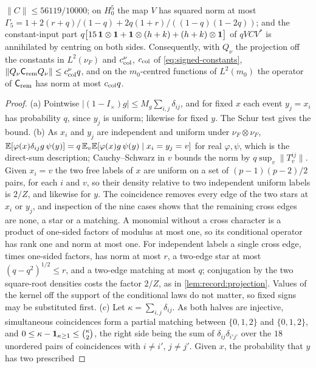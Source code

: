 \begin{lemma}
\begin{enumerate}[label=(\alph*)]
 $\|C\|\le56119/10000$; on $H_0^5$ the map $V$ has squared norm at most
 $\Gamma_5=1+2(r+q)/(1-q)+2q(1+r)/((1-q)(1-2q))$; and the constant-input part
 $q\bigl[15\,\mathbf 1\otimes\mathbf 1+\mathbf 1\otimes(h+k)+(h+k)\otimes\mathbf 1\bigr]$ of $qVCV^*$ is
 annihilated by centring on both sides. Consequently, with $Q_\nu$ the
 projection off the constants in $L^2(\nu_F)$ and $c^\nu_{\rm col}$, $c_{\rm col}$
 of \eqref{eq:signed-constants},
 $\|Q_\nu\mathsf C_{\rm rem}Q_\nu\|\le c^\nu_{\rm col}q$, and on the $m_0$-centred
 functions of $L^2(m_0)$ the operator of $\mathsf C_{\rm rem}$ has norm at most
 $c_{\rm col}q$.
\end{enumerate}
\end{lemma}

\begin{proof}
(a) Pointwise $|(1-I_\times)g|\le M_g\sum_{i,j}\delta_{ij}$, and for fixed $x$ each
event $y_j=x_i$ has probability $q$, since $y_j$ is uniform; likewise for fixed
$y$. The Schur test gives the bound.
(b) As $x_i$ and $y_j$ are independent and uniform under $\nu_F\otimes\nu_F$,
$\mathbb E[\varphi(x)\delta_{ij}g\,\psi(y)]=q\,\mathbb E_v\mathbb E[\varphi(x)g\,\psi(y)\mid x_i=y_j=v]$
for real $\varphi,\psi$, which is the direct-sum description; Cauchy--Schwarz in
$v$ bounds the norm by $q\sup_v\|T^{ij}_v\|$. Given $x_i=v$ the two free labels of
$x$ are uniform on a set of $(p-1)(p-2)/2$ pairs, for each $i$ and $v$, so their
density relative to two independent uniform labels is $2/Z$, and likewise for
$y$. The coincidence removes every edge of the two stars at $x_i$ or $y_j$, and
inspection of the nine cases shows that the remaining cross edges are none, a
star or a matching. A monomial without a cross character is a product of
one-sided factors of modulus at most one, so its conditional operator has rank
one and norm at most one. For independent labels a single cross edge, times
one-sided factors, has norm at most $r$, a two-edge star at most
$(q-q^2)^{1/2}\le r$, and a two-edge matching at most $q$; conjugation by the two
square-root densities costs the factor $2/Z$, as in \cref{lem:record:projection}.
Values of the kernel off the support of the conditional laws do not matter, so
fixed signs may be substituted first.
(c) Let $\kappa=\sum_{i,j}\delta_{ij}$. As both halves are injective, simultaneous
coincidences form a partial matching between $\{0,1,2\}$ and $\{0,1,2\}$, and
$0\le\kappa-\mathbf 1_{\kappa\ge1}\le\binom\kappa2$, the right side being the sum of
$\delta_{ij}\delta_{i'j'}$ over the $18$ unordered pairs of coincidences with
$i\ne i'$, $j\ne j'$. Given $x$, the probability that $y$ has two prescribed

\end{proof}
